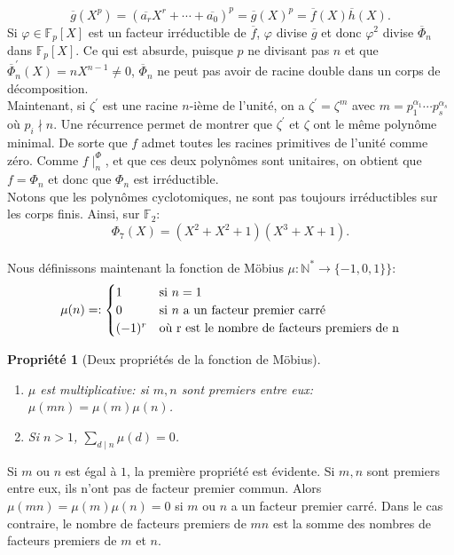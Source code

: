 \documentclass{article}
\theoremstyle{break}                  %
\newtheorem{propriete}{Propriété}
\begin{document}
$$\overline{g}(X^p) = (\overline{a_r} X^r + \cdots + \overline{a_0})^p = \overline{g}(X)^p = \overline{f}(X) \overline{h}(X).$$ Si $\varphi \in \mathbb F_p[X]$ est un facteur irréductible de $\overline{f}$, $\varphi$ divise $\overline{g}$ et donc $\varphi^2$ divise $\overline{\Phi}_n$ dans $\mathbb F_p[X]$. Ce qui est absurde, puisque $p$ ne divisant pas $n$ et que $\overline{\Phi}_n^\prime(X) = n X^{n-1} \neq 0$, $\overline{\Phi}_n$ ne peut pas avoir de racine double dans un corps de décomposition.\\

Maintenant, si $\zeta^\prime$ est une racine $n$-ième de l'unité, on a $\zeta^\prime = \zeta^m$ avec $m = p_1^{\alpha_1} \cdots p_s^{\alpha_s}$ où $p_i \nmid n$. Une récurrence permet de montrer que $\zeta^\prime$ et $\zeta$ ont le même polynôme minimal. De sorte que $f$ admet toutes les racines primitives de l'unité comme zéro. Comme $f \mid^ \Phi_n$, et que ces deux polynômes sont unitaires, on obtient que $f = \Phi_n$ et donc que $\Phi_n$ est irréductible.\\



Notons que les polynômes cyclotomiques, ne sont pas toujours irréductibles sur les corps finis. Ainsi, sur $\mathbb F_2$:
$$\Phi_7(X)= (X^2+X^2+1)(X^3+X+1).$$\\


Nous définissons maintenant la fonction de Möbius $\mu : \mathbb N^* \to \{-1, 0, 1\}\}$:
\begin{displaymath}
	\mu(n) = :
	\begin{cases}
		1 & \text{si } n = 1\\
		0 & \text{si } n \text{ a un facteur premier carré}\\
		(-1)^r & \text{où } $r$ \text{ est le nombre de facteurs premiers de } $n$\\
	\end{cases}
\end{displaymath}

\begin{propriete}[Deux propriétés de la fonction de Möbius]
	\begin{enumerate}
		\item $\mu$ est multiplicative: si $m,n $ sont premiers entre eux: $\mu(mn)= \mu(m)\mu(n)$.
		\item Si $n >1$, $\displaystyle \sum_{d \mid n} \mu(d) = 0$.
	\end{enumerate}
\end{propriete}
Si $m$ ou $n$ est égal à $1$, la première propriété est évidente. Si $m,n$ sont premiers entre eux, ils n'ont pas de facteur premier commun. Alors $\mu(mn)=\mu(m)\mu(n)=0$ si $m$ ou $n$ a un facteur premier carré. Dans le cas contraire, le nombre de facteurs premiers de $mn$ est la somme des nombres de facteurs premiers de $m$ et $n$.\\
\end{document}
